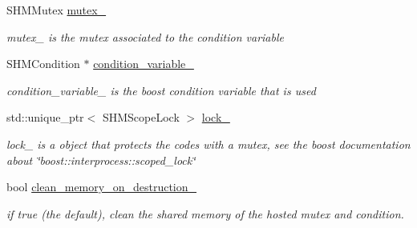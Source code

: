\begin{DoxyCompactItemize}
\item 
\mbox{\label{classshared__memory_1_1LockedConditionVariable_a757abc2190906a0773667b42be6e4e66}} 
S\+H\+M\+Mutex \hyperlink{classshared__memory_1_1LockedConditionVariable_a757abc2190906a0773667b42be6e4e66}{mutex\+\_\+}
\begin{DoxyCompactList}\small\item\em mutex\+\_\+ is the mutex associated to the condition variable \end{DoxyCompactList}\item 
\mbox{\label{classshared__memory_1_1LockedConditionVariable_a8bc7fb73332304b406335e38ba4cdd1b}} 
S\+H\+M\+Condition $\ast$ \hyperlink{classshared__memory_1_1LockedConditionVariable_a8bc7fb73332304b406335e38ba4cdd1b}{condition\+\_\+variable\+\_\+}
\begin{DoxyCompactList}\small\item\em condition\+\_\+variable\+\_\+ is the boost condition variable that is used \end{DoxyCompactList}\item 
\mbox{\label{classshared__memory_1_1LockedConditionVariable_a5509b431f2d459d92bfcc1b2d60651d1}} 
std\+::unique\+\_\+ptr$<$ S\+H\+M\+Scope\+Lock $>$ \hyperlink{classshared__memory_1_1LockedConditionVariable_a5509b431f2d459d92bfcc1b2d60651d1}{lock\+\_\+}
\begin{DoxyCompactList}\small\item\em lock\+\_\+ is a object that protects the codes with a mutex, see the boost documentation about \char`\"{}boost\+::interprocess\+::scoped\+\_\+lock\char`\"{} \end{DoxyCompactList}\item 
\mbox{\label{classshared__memory_1_1LockedConditionVariable_abe0963bc5746d19350e816ad42ff47b1}} 
bool \hyperlink{classshared__memory_1_1LockedConditionVariable_abe0963bc5746d19350e816ad42ff47b1}{clean\+\_\+memory\+\_\+on\+\_\+destruction\+\_\+}
\begin{DoxyCompactList}\small\item\em if true (the default), clean the shared memory of the hosted mutex and condition. \end{DoxyCompactList}\end{DoxyCompactItemize}
